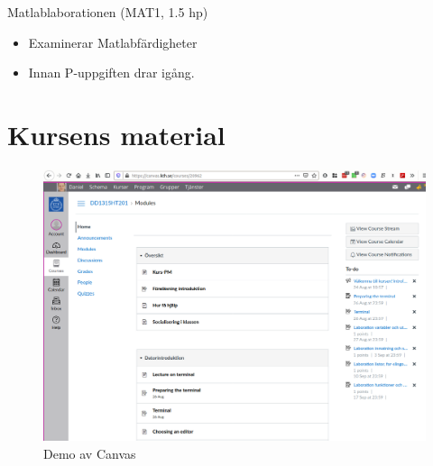 \begin{frame}
  \begin{block}{Matlablaborationen (MAT1, 1.5 hp)}
    \begin{itemize}
      \item Examinerar Matlabfärdigheter
      \item Innan P-uppgiften drar igång.
    \end{itemize}
  \end{block}
\end{frame}






\section{Kursens material}

\begin{frame}
  \begin{figure}
    \includegraphics[height=0.8\textheight]{canvas.png}
    \caption{Demo av Canvas}
  \end{figure}
\end{frame}

